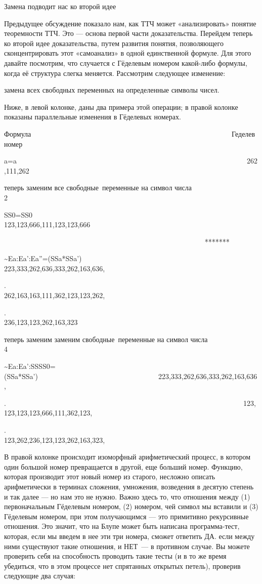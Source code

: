 \documentclass[../main.tex]{subfiles}
\begin{document}
Замена подводит нас ко второй идее

Предыдущее обсуждение показало нам, как ТТЧ может «анализировать» понятие теоремности ТТЧ. Это --- основа первой части доказательства. Перейдем теперь ко второй идее доказательства, путем развития понятия, позволяющего сконцентрировать этот «самоанализ» в одной единственной формуле. Для этого давайте посмотрим, что случается с Гёделевым номером какой-либо формулы, когда её структура слегка меняется. Рассмотрим следующее изменение:

замена всех свободных переменных на определенные символы чисел.

Ниже, в левой колонке, даны два примера этой операции; в правой колонке показаны параллельные изменения в Гёделевых номерах.

Формула~~~~~~~~~~~~~~~~~~~~~~~~~~~~~~~~~~~~~~~~~~~~~~~~~~~~~~~~ Геделев номер

a=a~~~~~~~~~~~~~~~~~~~~~~~~~~~~~~~~~~~~~~~~~~~~~~~~~~~~~~~~~~~~~~~~~262,111,262

теперь заменим все свободные~переменные на символ числа 2~~~~~~~~~~~~~~~~~~~~~~

SS0=SS0~~~~~~~~~~~~~~~~~~~~~~~~~~~~~~~~~~~~~~~~~~~~~~~~~~~~~~~~~ 123,123,666,111,123,123,666

~~~~~~~~~~~~~~~~~~~~~~~~~~~~~~~~~~~~~~~~~~~~~~~~~~~~~~~~ *******

\textasciitilde Ea:Ea':Ea''=(SSa*SSa')~~~~~~~~~~~~~~~~~~~~~~~~~~~~~~~~~~~~~ 223,333,262,636,333,262,163,636,

.~~~~~~~~~~~~~~~~~~~~~~~~~~~~~~~~~~~~~~~~~~~~~~~~~~~~~~~~~~~~~~~~~~~ 262,163,163,111,362,123,123,262,

.~~~~~~~~~~~~~~~~~~~~~~~~~~~~~~~~~~~~~~~~~~~~~~~~~~~~~~~~~~~~~~~~~~~ 236,123,123,262,163,323

теперь заменим заменим свободные~переменные на символ числа 4~~~~~~~~~~~~~~~~~~~~~~

\textasciitilde Ea:Ea':SSSS0=(SSa*SSa')~~~~~~~~~~~~~~~~~~~~~~~~~~~~~~~~~~223,333,262,636,333,262,163,636,

.~~~~~~~~~~~~~~~~~~~~~~~~~~~~~~~~~~~~~~~~~~~~~~~~~~~~~~~~~~~~~~~~~~~123,123,123,123,666,111,362,123,

.~~~~~~~~~~~~~~~~~~~~~~~~~~~~~~~~~~~~~~~~~~~~~~~~~~~~~~~~~~~~~~~~~~ 123,262,236,123,123,262,163,323,

В правой колонке происходит изоморфный арифметический процесс, в котором один большой номер превращается в другой, еще больший номер. Функцию, которая производит этот новый номер из старого, несложно описать арифметически в терминах сложения, умножения, возведения в десятую степень и так далее --- но нам это не нужно. Важно здесь то, что отношения между (1) первоначальным Гёделевым номером, (2) номером, чей символ мы вставили и (3) Гёделевым номером, при этом получающимся --- это примитивно рекурсивные отношения. Это значит, что на Блупе может быть написана программа-тест, которая, если мы введем в нее эти три номера, сможет ответить ДА. если между ними существуют такие отношения, и НЕТ~--- в противном случае. Вы можете проверить себя на способность проводить такие тесты (и в то же время убедиться, что в этом процессе нет спрятанных открытых петель), проверив следующие два случая:
\end{document}
